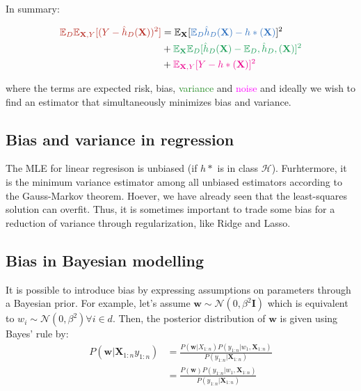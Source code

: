 \documentclass[a4paper,10pt,twoside]{article}
\makeatletter
\def\mathcolor#1#{\@mathcolor{#1}}
\def\@mathcolor#1#2#3{%
  \protect\leavevmode
  \begingroup
    \color#1{#2}#3%
  \endgroup
}
\makeatother
\begin{document}
In summary:

\begin{align*}
    \mathcolor{BrickRed}{\mathbb{E}_D\mathbb{E}_{\mathbf{X},Y}[(Y-\hat{h}_D(\mathbf{X}))^2]} &= \mathbb{E}_{\mathbf{X}}[\mathcolor{NavyBlue}{\mathbb{E}_D\hat{h}_D(\mathbf{X})-h*(\mathbf{X})}]^2\\
    &+\mathcolor{ForestGreen}{\mathbb{E}_{\mathbf{X}}\mathbb{E}_D[\hat{h}_D(\mathbf{X})-\mathbb{E}_D,\hat{h}_D,(\mathbf{X})]^2}\\
    &+\mathcolor{magenta}{\mathbb{E}_{\mathbf{X},Y}[Y-h*(\mathbf{X})]^2}
\end{align*}

where the terms are \textcolor{BrickRed}{expected risk}, \textcolor{NavyBlue}{bias}, \textcolor{ForestGreen}{variance} and \textcolor{magenta}{noise} and ideally we wish to find an estimator that simultaneously minimizes bias and variance.

\subsection{Bias and variance in regression}

The MLE for linear regresison is unbiased (if $h*$ is in class $\mathcal{H}$). Furhtermore, it is the minimum variance estimator among all unbiased estimators according to the Gauss-Markov theorem. Hoever, we have already seen that the least-squares solution can overfit. Thus, it is sometimes important to trade some bias for a reduction of variance through regularization, like Ridge and Lasso.

\subsection{Bias in Bayesian modelling}

It is possible to introduce bias by expressing assumptions on parameters through a Bayesian prior. For example, let's assume $\mathbf{w}\sim\mathcal{N}(0,\beta^2\mathbf{I})$ which is equivalent to $w_i\sim\mathcal{N}(0,\beta^2)\forall i\in d$. Then, the posterior distribution of $\mathbf{w}$ is given using Bayes' rule by:
\begin{align*}
    P(\mathbf{w}|\mathbf{X}_{1:n}y_{1:n})&=\frac{P(\mathbf{w}|X_{1:n})P(y_{1:n}|w_1,\mathbf{X}_{1:n})}{P(y_{1:n}|\textbf{X}_{1:n})}\\
    &=\frac{P(\mathbf{w})P(y_{1:n}|w_1,\mathbf{X}_{1:n})}{P(y_{1:n}|\textbf{X}_{1:n})}
\end{align*}
\end{document}
